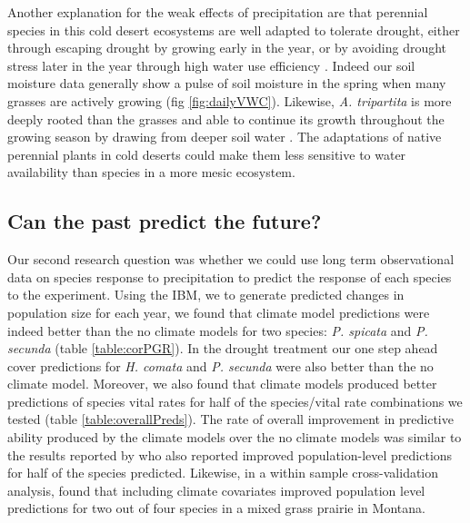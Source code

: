 \documentclass[11pt]{article}
\begin{document}
\begin{doublespacing}
Another explanation for the weak effects of precipitation are that perennial species in this cold desert ecosystems are well adapted to tolerate drought, either through escaping drought by growing early in the year, or by avoiding drought stress later in the year through high water use efficiency \citep{bazzaz_physiological_1979,franks_plasticity_2011}. Indeed our soil moisture data generally show a pulse of soil moisture in the spring when many grasses are actively growing (fig \ref{fig:dailyVWC}). Likewise, \textit{A. tripartita} is more deeply rooted than the grasses and able to continue its growth throughout the growing season by drawing from deeper soil water \citep{germino_desert_2014}. The adaptations of native perennial plants in cold deserts could make them less sensitive to water availability than species in a more mesic ecosystem. 

\subsection*{Can the past predict the future?}
Our second research question was whether we could use long term observational data on species response to precipitation to predict the response of each species to the experiment. Using the IBM, we to generate predicted changes in population size for each year, we found that climate model predictions were indeed better than the no climate models for two species: \textit{P. spicata} and \textit{P. secunda} (table \ref{table:corPGR}). In the drought treatment our one step ahead cover predictions for \textit{H. comata} and \textit{P. secunda} were also better than the no climate model. Moreover, we also found that climate models produced better predictions of species vital rates for half of the species/vital rate combinations we tested (table \ref{table:overallPreds}). The rate of overall improvement in predictive ability produced by the climate models over the no climate models was similar to the results reported by \citep{adler_can_2013} who also reported improved population-level predictions for half of the species predicted. Likewise, in a within sample cross-validation analysis, \citep{tredennick_we_2016} found that including climate covariates improved population level predictions for two out of four species in a mixed grass prairie in Montana.  


\end{doublespacing}
\end{document}
